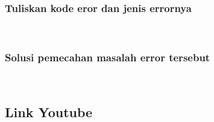 	\subsubsection{Tuliskan kode eror dan jenis errornya}\hfill\\
	 
	\subsubsection{Solusi pemecahan masalah error tersebut}\hfill\\
	
	
\subsection{Link Youtube}
	
	\subsubsection{}\hfill\\

	